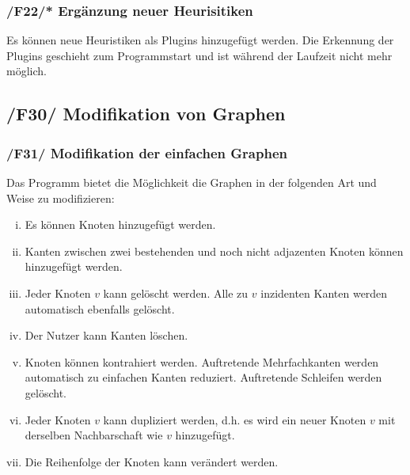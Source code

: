 \documentclass{article}
\begin{document}
	\subsubsection*{/F22/* Ergänzung neuer Heurisitiken} \label{f22} 
	Es können neue Heuristiken als Plugins hinzugefügt werden. Die Erkennung der Plugins geschieht zum Programmstart und ist während der Laufzeit nicht mehr möglich.
	
	
	\newpage
	
	\subsection*{/F30/ Modifikation von Graphen} \label{f30} 
	\subsubsection*{/F31/ Modifikation der einfachen Graphen} \label{f31} 
	Das Programm bietet die Möglichkeit die Graphen in der folgenden Art und Weise zu modifizieren:
	\begin{enumerate}[i)]
		\item{Es können Knoten hinzugefügt werden.}
		\item{Kanten zwischen zwei bestehenden und noch nicht adjazenten Knoten können hinzugefügt werden.}
		\item{Jeder Knoten $v$ kann gelöscht werden. Alle zu $v$ inzidenten Kanten werden automatisch ebenfalls gelöscht.}
		\item{Der Nutzer kann Kanten löschen.}
		\item{Knoten können kontrahiert werden. Auftretende Mehrfachkanten werden automatisch zu einfachen Kanten reduziert. Auftretende Schleifen werden gelöscht.}
		\item{Jeder Knoten $v$ kann dupliziert werden, d.h. es wird ein neuer Knoten $v$ mit derselben Nachbarschaft wie $v$ hinzugefügt.}
		\item{Die Reihenfolge der Knoten kann verändert werden.}
	\end{enumerate}
	
\end{document}
